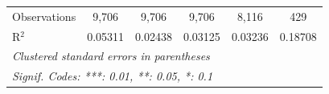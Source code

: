 \begin{table}[htbp]
{\begin{tabular}{lccccc}
      Observations                        & 9,706         & 9,706                  & 9,706          & 8,116          & 429\\  
      R$^2$                               & 0.05311       & 0.02438                & 0.03125        & 0.03236        & 0.18708\\  
      \midrule \midrule
      \multicolumn{6}{l}{\emph{Clustered standard errors in parentheses}}\\
      \multicolumn{6}{l}{\emph{Signif. Codes: ***: 0.01, **: 0.05, *: 0.1}}\\
   \end{tabular}}
\end{table}


